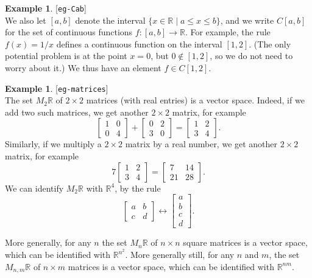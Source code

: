 \documentclass{amsart}
\newcommand{\lbl}[1]{\label{#1}\textup{[\texttt{#1}]}\ \\}
\newcommand{\lbl}{\label}
\newcommand{\R}         {{\mathbb{R}}}
\newcommand{\bsm}       {\left[\begin{smallmatrix}}
\newcommand{\esm}       {\end{smallmatrix}\right]}
\newcommand{\tm}        {\times}
\newcommand{\xra}       {\xrightarrow}
\newcommand{\st}        {\;|\;}
\renewcommand{\:}       {\colon}
\theoremstyle{definition}
\newtheorem{example}[theorem]{Example}
\begin{document}
\begin{example}\lbl{eg-Cab}
 We also let $[a,b]$ denote the interval
 $\{x\in\R\st a\leq x\leq b\}$, and we write $C[a,b]$ for
 the set of continuous functions $f\:[a,b]\xra{}\R$.  For
 example, the rule $f(x)=1/x$ defines a continuous function
 on the interval $[1,2]$.  (The only potential problem is at
 the point $x=0$, but $0\not\in[1,2]$, so we do not need to
 worry about it.)  We thus have an element $f\in C[1,2]$.
\end{example}

\begin{example}\lbl{eg-matrices}
 The set $M_2\R$ of $2\tm 2$ matrices (with real entries) is
 a vector space.  Indeed, if we add two such matrices, we
 get another $2\tm 2$ matrix, for example
 \[ \bsm 1 & 0 \\ 0 & 4 \esm + \bsm 0 & 2 \\ 3 & 0 \esm =
     \bsm 1 & 2 \\ 3 & 4 \esm.
 \]
 Similarly, if we multiply a $2\tm 2$ matrix by a real
 number, we get another $2\tm 2$ matrix, for example
 \[ 7 \bsm 1 & 2 \\ 3 & 4 \esm = \bsm 7 & 14 \\ 21 & 28 \esm. \]
 We can identify $M_2\R$ with $\R^4$, by the rule
 \[ \bsm a & b \\ c & d \esm \leftrightarrow
     \bsm a \\ b \\ c \\ d \esm.
 \]

 More generally, for any $n$ the set $M_n\R$ of $n\tm n$
 square matrices is a vector space, which can be identified
 with $\R^{n^2}$.  More generally still, for any $n$ and
 $m$, the set $M_{n,m}\R$ of $n\tm m$ matrices is a vector
 space, which can be identified with $\R^{nm}$.
\end{example}
\end{document}
